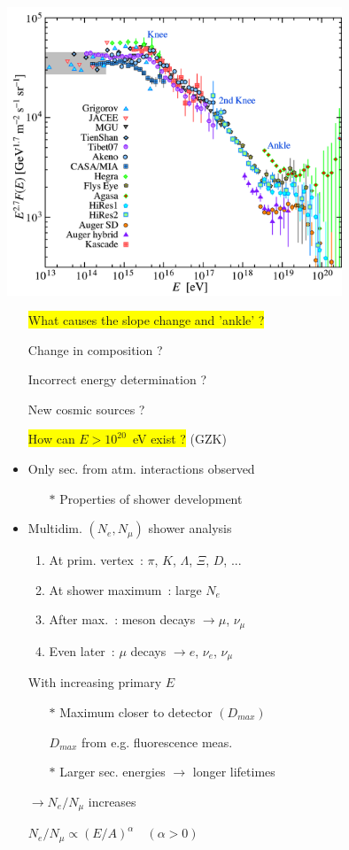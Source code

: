 \newpage
%
\includegraphics[keepaspectratio,width=10cm]{cr-all-scaled27}
%
\begin{itemize}
\item[] \colorbox{yellow}{What causes the slope change and 'ankle' ?}
\item[] Change in composition ?
\item[] Incorrect energy determination ?
\item[] New cosmic sources ?
\item[] \colorbox{yellow}{How can $E > 10^{20}$~eV exist ?} (GZK)
\end{itemize}

\Tr
{}%
\begin{itemize}
\item Only sec. from atm. interactions observed
\begin{itemize}
\item[$\ast$] Properties of shower development
\end{itemize}
\item Multidim. $(N_{e},N_{\mu})$ shower analysis
\begin{enumerate}
\item At prim. vertex~: $\pi$, $K$, $\Lambda$, $\Xi$, $D$, ...
\item At shower maximum~: large $N_{e}$
\item After max.~: meson decays $\rightarrow \mu$, $\nu_{\mu}$
\item Even later~: $\mu$ decays $\rightarrow e$, $\nu_{e}$, $\nu_{\mu}$
\end{enumerate}
\item[] {\blue With increasing primary $E$}
\begin{itemize}
\item[$\ast$] Maximum closer to detector $(D_{max})$
\item[] $D_{max}$ from e.g. fluorescence meas.
\item[$\ast$] Larger sec. energies $\rightarrow$ longer lifetimes
\end{itemize}
\item[] {\blue $\rightarrow N_{e}/N_{\mu}$ increases}
\item[] $N_{e}/N_{\mu} \propto (E/A)^{\alpha} \quad (\alpha > 0)$
\end{itemize}

